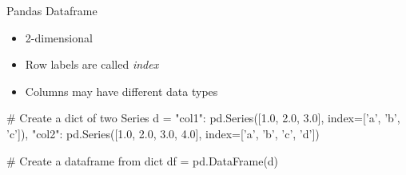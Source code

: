 \documentclass[ignorenonframetext,xcolor=x11names]{beamer}
\begin{document}







\begin{frame}[label=full,fragile]{Pandas Dataframe}
\begin{itemize}
   \item 2-dimensional
   \item Row labels are called \emph{index}
   \item Columns may have different data types
\end{itemize}
\footnotesize
\begin{pythoncode}
# Create a dict of two Series
d = {
    "col1": pd.Series([1.0, 2.0, 3.0], 
                index=['a', 'b', 'c']),
    "col2": pd.Series([1.0, 2.0, 3.0, 4.0], 
                index=['a', 'b', 'c', 'd'])
}

# Create a dataframe from dict
df = pd.DataFrame(d)
\end{pythoncode}
\end{frame}
\end{document}
